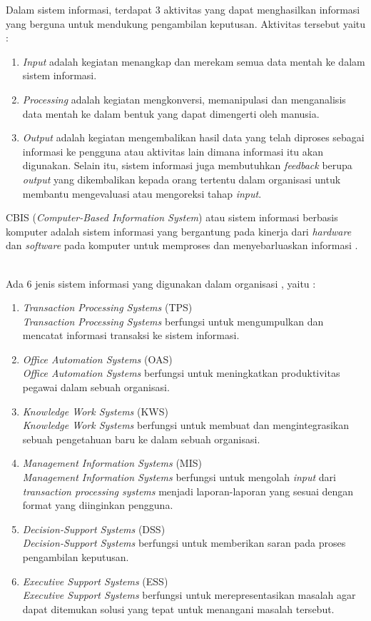 Dalam sistem informasi, terdapat 3 aktivitas yang dapat menghasilkan informasi yang berguna untuk mendukung pengambilan keputusan. Aktivitas tersebut yaitu \cite{Laudon:2011} : 
\begin{enumerate}
	\item \textit{Input} adalah kegiatan menangkap dan merekam semua data mentah ke dalam sistem informasi.
	\item \textit{Processing} adalah kegiatan mengkonversi, memanipulasi dan menganalisis data mentah ke dalam bentuk yang dapat dimengerti oleh manusia.
	\item \textit{Output} adalah kegiatan mengembalikan hasil data yang telah diproses sebagai informasi ke pengguna atau aktivitas lain dimana informasi itu akan digunakan. Selain itu, sistem informasi juga membutuhkan \textit{feedback} berupa \textit{output} yang dikembalikan kepada orang tertentu dalam organisasi untuk membantu mengevaluasi atau mengoreksi tahap \textit{input}.
\end{enumerate}

CBIS (\textit{Computer-Based Information System}) atau sistem informasi berbasis komputer adalah sistem informasi yang bergantung pada kinerja dari \textit{hardware} dan \textit{software} pada komputer untuk memproses dan menyebarluaskan informasi \cite{Laudon:2011}. \

Ada 6 jenis sistem informasi yang digunakan dalam organisasi \cite{Laudon:2011}, yaitu :
\begin{enumerate}
	\item \textit{Transaction Processing Systems} (TPS)\\
	\textit{Transaction Processing Systems} berfungsi untuk mengumpulkan dan mencatat informasi transaksi ke sistem informasi.
	\item \textit{Office Automation Systems} (OAS)\\
	\textit{Office Automation Systems} berfungsi untuk meningkatkan produktivitas pegawai dalam sebuah organisasi.
	\item \textit{Knowledge Work Systems} (KWS) \\
	\textit{Knowledge Work Systems} berfungsi untuk membuat dan mengintegrasikan sebuah pengetahuan baru ke dalam sebuah organisasi.
	\item \textit{Management Information Systems} (MIS) \\
	\textit{Management Information Systems} berfungsi untuk mengolah \textit{input} dari \textit{transaction processing systems} menjadi laporan-laporan yang sesuai dengan format yang diinginkan pengguna.
	\item \textit{Decision-Support Systems} (DSS) \\
	\textit{Decision-Support Systems} berfungsi untuk memberikan saran pada proses pengambilan keputusan.
	\item \textit{Executive Support Systems} (ESS) \\
	\textit{Executive Support Systems} berfungsi untuk merepresentasikan masalah agar dapat ditemukan solusi yang tepat untuk menangani masalah tersebut.
\end{enumerate}

